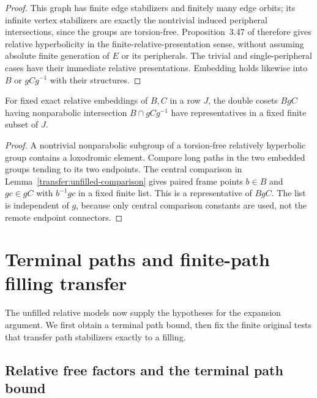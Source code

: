 \begin{proof}
This graph has finite edge stabilizers and finitely many edge orbits;
its infinite vertex stabilizers are exactly the nontrivial induced
peripheral intersections, since the groups are torsion-free.
Proposition~3.47 of \cite{GerasimovPotyagailo2015} therefore gives
relative hyperbolicity in the finite-relative-presentation sense,
without assuming absolute finite generation of $E$ or its peripherals.
The trivial and single-peripheral cases have their immediate relative
presentations. Embedding holds likewise into \(B\) or \(gCg^{-1}\)
with their structures.

\end{proof}

\begin{corollary}
\label{transfer:unfilled-double-cosets}
For fixed exact relative embeddings of $B,C$ in a row $J$, the double
cosets $BgC$ having nonparabolic intersection $B\cap gCg^{-1}$
have representatives in a fixed finite subset of $J$.
\end{corollary}
\begin{proof}
A nontrivial nonparabolic subgroup of a torsion-free relatively
hyperbolic group contains a loxodromic element. Compare long paths
in the two embedded groups tending to its two endpoints. The central
comparison in Lemma~\ref{transfer:unfilled-comparison} gives paired
frame points $b\in B$ and $gc\in gC$ with $b^{-1}gc$ in a fixed
finite list. This is a representative of $BgC$. The list is
independent of $g$, because only central comparison constants are
used, not the remote endpoint connectors.
\end{proof}

\section{Terminal paths and finite-path filling transfer}
\label{sec:transfer-relative}

The unfilled relative models now supply the hypotheses for the
expansion argument. We first obtain a terminal path bound, then fix
the finite original tests that transfer path stabilizers exactly to
a filling.

\subsection{Relative free factors and the terminal path bound}

